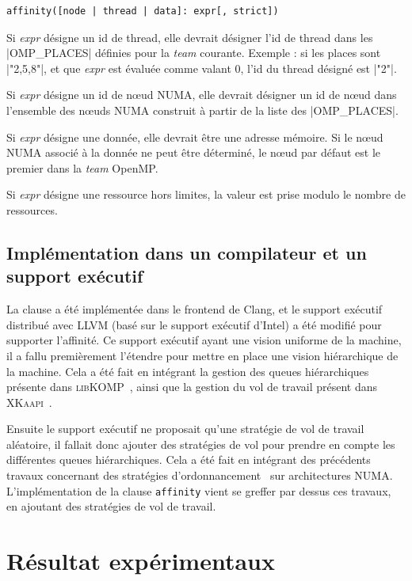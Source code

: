 \documentclass[parallelisme]{compas2017}
\newcommand{\kaapi}{\textsc{\mbox{XKaapi}}\xspace}
\newcommand{\libXKOMP}{\textsc{libKOMP}\xspace}
\begin{document}
\begin{lstlisting}
affinity([node | thread | data]: expr[, strict])
\end{lstlisting}

Si \emph{expr} désigne un id de thread, elle devrait désigner l'id de thread dans
les |OMP_PLACES| définies pour la \textit{team} courante. Exemple : si les places
sont |"{2},{5},{8}"|, et que \emph{expr} est évaluée comme valant 0, l'id du thread désigné est |"{2}"|.

Si \emph{expr} désigne un id de nœud NUMA, elle devrait désigner un id de nœud
dans l'ensemble des nœuds NUMA construit à partir de la liste des |OMP_PLACES|.

Si \emph{expr} désigne une donnée, elle devrait être une adresse mémoire.
Si le nœud NUMA associé à la donnée ne peut être déterminé, le nœud par défaut
est le premier dans la \textit{team} OpenMP.

Si \emph{expr} désigne une ressource hors limites, la valeur est prise modulo le
nombre de ressources.

\subsection{Implémentation dans un compilateur et un support exécutif}
\label{subsec:implem-runtime}

La clause a été implémentée dans le frontend de Clang, et le support
exécutif distribué avec LLVM (basé sur le support exécutif d'Intel) a été modifié
pour supporter l'affinité.
Ce support exécutif ayant une vision uniforme de la machine, il a fallu premièrement l'étendre
pour mettre en place une vision hiérarchique de la machine.
Cela a été fait en intégrant la gestion des queues hiérarchiques présente dans
\libXKOMP~\cite{Durand2013,libkomp}, ainsi que la gestion du vol de travail présent
dans \kaapi~\cite{Bleuse2014,parco2015}.

Ensuite le support exécutif ne proposait qu'une stratégie de vol de travail aléatoire,
il fallait donc ajouter des stratégies de vol pour prendre en compte les différentes
queues hiérarchiques.
Cela a été fait en intégrant des précédents travaux concernant des stratégies
d'ordonnancement~\cite{Virouleau:2016:UDD:2990973.2990982} sur architectures
NUMA.
L'implémentation de la clause \verb/affinity/ vient se greffer par dessus ces travaux,
en ajoutant des stratégies de vol de travail.

\section{Résultat expérimentaux}
\label{sec:experiment}
\end{document}
